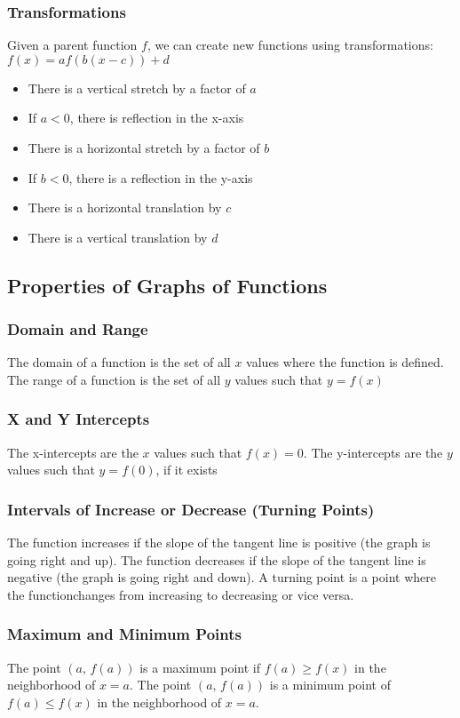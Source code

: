 \documentclass{article}
\begin{document}
	\subsubsection{Transformations}
	Given a parent function $f$, we can create new functions using transformations: $f(x)=af(b(x-c))+d$
	\begin{itemize}
		\item There is a vertical stretch by a factor of $a$
		\item If $a<0$, there is reflection in the x-axis
		\item There is a horizontal stretch by a factor of $b$
		\item If $b<0$, there is a reflection in the y-axis
		\item There is a horizontal translation by $c$
		\item There is a vertical translation by $d$
	\end{itemize}
	\subsection{Properties of Graphs of Functions}
	\subsubsection{Domain and Range}
	The domain of a function is the set of all $x$ values where the function is defined. The range of a function is the set of all $y$ values such that $y=f(x)$
	\subsubsection{X and Y Intercepts}
	The x-intercepts are the $x$ values such that $f(x)=0$. The y-intercepts are the $y$ values such that $y=f(0)$, if it exists
	\subsubsection{Intervals of Increase or Decrease (Turning Points)}
	The function increases if the slope of the tangent line is positive (the graph is going right and up). The function decreases if the slope of the tangent line is negative (the graph is going right and down). A turning point is a point where the functionchanges from increasing to decreasing or vice versa.
	\subsubsection{Maximum and Minimum Points}
	The point $(a,\,f(a))$ is a maximum point if $f(a)\geqslant f(x)$ in the neighborhood of $x=a$. The point $(a,\,f(a))$ is a minimum point of $f(a)\leqslant f(x)$ in the neighborhood of $x=a$.
\end{document}
